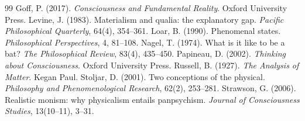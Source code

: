 \documentclass{situationist-preprint}
\begin{document}
\begin{thebibliography}{99}
 Goff, P. (2017). \emph{Consciousness and Fundamental Reality}. Oxford University Press.
 Levine, J. (1983). Materialism and qualia: the explanatory gap. \emph{Pacific Philosophical Quarterly}, 64(4), 354--361.
 Loar, B. (1990). Phenomenal states. \emph{Philosophical Perspectives}, 4, 81--108.
 Nagel, T. (1974). What is it like to be a bat? \emph{The Philosophical Review}, 83(4), 435--450.
 Papineau, D. (2002). \emph{Thinking about Consciousness}. Oxford University Press.
 Russell, B. (1927). \emph{The Analysis of Matter}. Kegan Paul.
 Stoljar, D. (2001). Two conceptions of the physical. \emph{Philosophy and Phenomenological Research}, 62(2), 253--281.
 Strawson, G. (2006). Realistic monism: why physicalism entails panpsychism. \emph{Journal of Consciousness Studies}, 13(10--11), 3--31.
\end{thebibliography}
\end{document}
